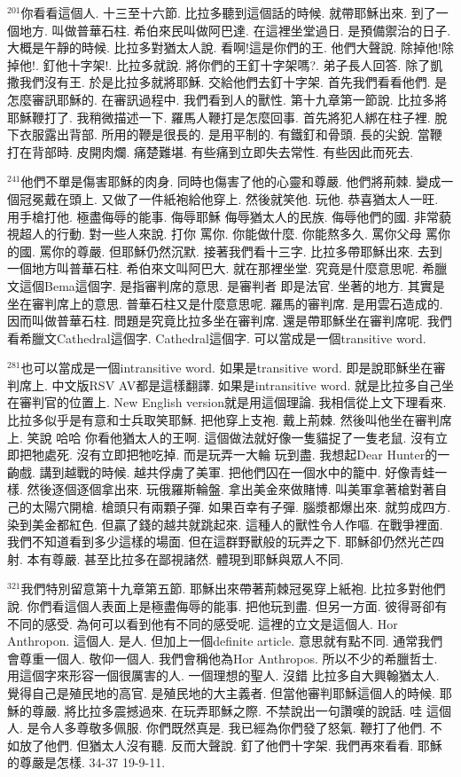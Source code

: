 \documentclass{book}
\begin{document}
$^{201}$你看看這個人.
十三至十六節.
比拉多聽到這個話的時候.
就帶耶穌出來.
到了一個地方.
叫做普華石柱.
希伯來民叫做阿巴達.
在這裡坐堂過日.
是預備禦治的日子.
大概是午靜的時候.
比拉多對猶太人說.
看啊!這是你們的王.
他們大聲說.
除掉他!除掉他!.
釘他十字架!.
比拉多就說.
將你們的王釘十字架嗎?.
弟子長人回答.
除了凱撒我們沒有王.
於是比拉多就將耶穌.
交給他們去釘十字架.
首先我們看看他們.
是怎麼審訊耶穌的.
在審訊過程中.
我們看到人的獸性.
第十九章第一節說.
比拉多將耶穌鞭打了.
我稍微描述一下.
羅馬人鞭打是怎麼回事.
首先將犯人綁在柱子裡.
脫下衣服露出背部.
所用的鞭是很長的.
是用平制的.
有鐵釘和骨頭.
長的尖銳.
當鞭打在背部時.
皮開肉爛.
痛楚難堪.
有些痛到立即失去常性.
有些因此而死去.

$^{241}$他們不單是傷害耶穌的肉身.
同時也傷害了他的心靈和尊嚴.
他們將荊棘.
變成一個冠冕戴在頭上.
又做了一件紙袍給他穿上.
然後就笑他.
玩他.
恭喜猶太人一旺.
用手槍打他.
極盡侮辱的能事.
侮辱耶穌 侮辱猶太人的民族.
侮辱他們的國.
非常藐視超人的行動.
對一些人來說.
打你 罵你.
你能做什麼.
你能熬多久.
罵你父母 罵你的國.
罵你的尊嚴.
但耶穌仍然沉默.
接著我們看十三字.
比拉多帶耶穌出來.
去到一個地方叫普華石柱.
希伯來文叫阿巴大.
就在那裡坐堂.
究竟是什麼意思呢.
希臘文這個Bema這個字.
是指審判席的意思.
是審判者 即是法官.
坐著的地方.
其實是坐在審判席上的意思.
普華石柱又是什麼意思呢.
羅馬的審判席.
是用雲石造成的.
因而叫做普華石柱.
問題是究竟比拉多坐在審判席.
還是帶耶穌坐在審判席呢.
我們看希臘文Cathedral這個字.
Cathedral這個字.
可以當成是一個transitive word.

$^{281}$也可以當成是一個intransitive word.
如果是transitive word.
即是說耶穌坐在審判席上.
中文版RSV AV都是這樣翻譯.
如果是intransitive word.
就是比拉多自己坐在審判官的位置上.
New English version就是用這個理論.
我相信從上文下理看來.
比拉多似乎是有意和士兵取笑耶穌.
把他穿上支袍.
戴上荊棘.
然後叫他坐在審判席上.
笑說 哈哈 你看他猶太人的王啊.
這個做法就好像一隻貓捉了一隻老鼠.
沒有立即把牠處死.
沒有立即把牠吃掉.
而是玩弄一大輪 玩到盡.
我想起Dear Hunter的一齣戲.
講到越戰的時候.
越共俘虜了美軍.
把他們囚在一個水中的籠中.
好像青蛙一樣.
然後逐個逐個拿出來.
玩俄羅斯輪盤.
拿出美金來做賭博.
叫美軍拿著槍對著自己的太陽穴開槍.
槍頭只有兩顆子彈.
如果百幸有子彈.
腦漿都爆出來.
就剪成四方.
染到美金都紅色.
但贏了錢的越共就跳起來.
這種人的獸性令人作嘔.
在戰爭裡面.
我們不知道看到多少這樣的場面.
但在這群野獸般的玩弄之下.
耶穌卻仍然光芒四射.
本有尊嚴.
甚至比拉多在鄙視諸然.
體現到耶穌與眾人不同.

$^{321}$我們特別留意第十九章第五節.
耶穌出來帶著荊棘冠冕穿上紙袍.
比拉多對他們說.
你們看這個人表面上是極盡侮辱的能事.
把他玩到盡.
但另一方面.
彼得哥卻有不同的感受.
為何可以看到他有不同的感受呢.
這裡的立文是這個人.
Hor Anthropon.
這個人.
是人.
但加上一個definite article.
意思就有點不同.
通常我們會尊重一個人.
敬仰一個人.
我們會稱他為Hor Anthropos.
所以不少的希臘哲士.
用這個字來形容一個很厲害的人.
一個理想的聖人.
沒錯 比拉多自大興翰猶太人.
覺得自己是殖民地的高官.
是殖民地的大主義者.
但當他審判耶穌這個人的時候.
耶穌的尊嚴.
將比拉多震撼過來.
在玩弄耶穌之際.
不禁說出一句讚嘆的說話.
哇 這個人.
是令人多尊敬多佩服.
你們既然真是.
我已經為你們發了怒氣.
鞭打了他們.
不如放了他們.
但猶太人沒有聽.
反而大聲說.
釘了他們十字架.
我們再來看看.
耶穌的尊嚴是怎樣.
34-37 19-9-11.
\end{document}
